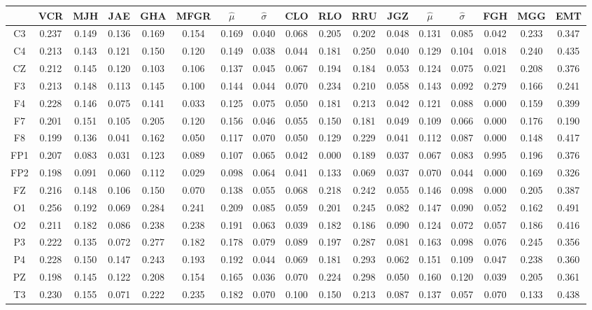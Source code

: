 \documentclass[12pt,a4paper]{mitthesis}
\begin{document}
\begin{SidewaysFigure}
\centering
\begin{tabular}{c||ccccc|cc||cccc|cc||ccc}
& VCR & MJH & JAE & GHA & MFGR &$\widehat{\mu}$ & $\widehat{\sigma}$
& CLO & RLO & RRU & JGZ &$\widehat{\mu}$ & $\widehat{\sigma}$
& FGH & MGG & EMT \\
\hline
C3&0.237&0.149&0.136&0.169&0.154&0.169&0.040&0.068&0.205&0.202&0.048&0.131&0.085&0.042&0.233&0.347 \\
C4&0.213&0.143&0.121&0.150&0.120&0.149&0.038&0.044&0.181&0.250&0.040&0.129&0.104&0.018&0.240&0.435 \\
CZ&0.212&0.145&0.120&0.103&0.106&0.137&0.045&0.067&0.194&0.184&0.053&0.124&0.075&0.021&0.208&0.376 \\
F3&0.213&0.148&0.113&0.145&0.100&0.144&0.044&0.070&0.234&0.210&0.058&0.143&0.092&0.279&0.166&0.241 \\
F4&0.228&0.146&0.075&0.141&0.033&0.125&0.075&0.050&0.181&0.213&0.042&0.121&0.088&0.000&0.159&0.399 \\
F7&0.201&0.151&0.105&0.205&0.120&0.156&0.046&0.055&0.150&0.181&0.049&0.109&0.066&0.000&0.176&0.190 \\
F8&0.199&0.136&0.041&0.162&0.050&0.117&0.070&0.050&0.129&0.229&0.041&0.112&0.087&0.000&0.148&0.417 \\
FP1&0.207&0.083&0.031&0.123&0.089&0.107&0.065&0.042&0.000&0.189&0.037&0.067&0.083&0.995&0.196&0.376 \\
FP2&0.198&0.091&0.060&0.112&0.029&0.098&0.064&0.041&0.133&0.069&0.037&0.070&0.044&0.000&0.169&0.326 \\
FZ&0.216&0.148&0.106&0.150&0.070&0.138&0.055&0.068&0.218&0.242&0.055&0.146&0.098&0.000&0.205&0.387 \\
O1&0.256&0.192&0.069&0.284&0.241&0.209&0.085&0.059&0.201&0.245&0.082&0.147&0.090&0.052&0.162&0.491 \\
O2&0.211&0.182&0.086&0.238&0.238&0.191&0.063&0.039&0.182&0.186&0.090&0.124&0.072&0.057&0.186&0.416 \\
P3&0.222&0.135&0.072&0.277&0.182&0.178&0.079&0.089&0.197&0.287&0.081&0.163&0.098&0.076&0.245&0.356 \\
P4&0.228&0.150&0.147&0.243&0.193&0.192&0.044&0.069&0.181&0.293&0.062&0.151&0.109&0.047&0.238&0.360 \\
PZ&0.198&0.145&0.122&0.208&0.154&0.165&0.036&0.070&0.224&0.298&0.050&0.160&0.120&0.039&0.205&0.361 \\
T3&0.230&0.155&0.071&0.222&0.235&0.182&0.070&0.100&0.150&0.213&0.087&0.137&0.057&0.070&0.133&0.438 \\

\end{tabular}
\end{SidewaysFigure}
\end{document}
